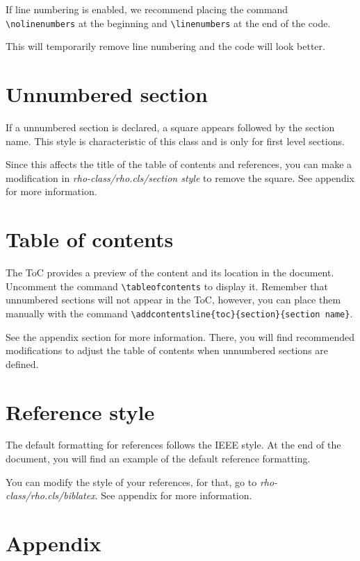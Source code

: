 \documentclass[9pt,a4paper,twoside]{rho-class/rho}
\begin{document}
    If line numbering is enabled, we recommend placing the command \verb|\nolinenumbers| at the beginning and \verb|\linenumbers| at the end of the code. 
    
    This will temporarily remove line numbering and the code will look better.

\section*{Unnumbered section} \label{sec:unsec}

    If a unnumbered section is declared, a square appears followed by the section name. This style is characteristic of this class and is only for first level sections.

    Since this affects the title of the table of contents and references, you can make a modification in \textit{rho-class/rho.cls/section style} to remove the square. See appendix for more information.

\section{Table of contents}

    The ToC provides a preview of the content and its location in the document. Uncomment the command \verb|\tableofcontents| to display it. Remember that unnumbered sections will not appear in the ToC, however, you can place them manually with the command \verb|\addcontentsline{toc}{section}{section name}|.

    See the appendix section for more information. There, you will find recommended modifications to adjust the table of contents when unnumbered sections are defined.

\section{Reference style}

    The default formatting for references follows the IEEE style. At the end of the document, you will find an example of the default reference formatting.

    You can modify the style of your references, for that, go to \textit{rho-class/rho.cls/biblatex}. See appendix for more information.

\section{Appendix}
\end{document}
